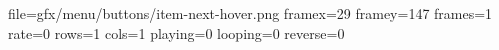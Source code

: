 file=gfx/menu/buttons/item-next-hover.png
framex=29
framey=147
frames=1
rate=0
rows=1
cols=1
playing=0
looping=0
reverse=0